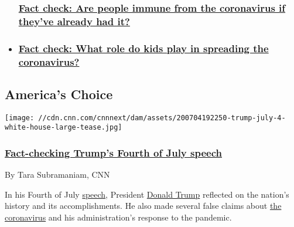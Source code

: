 \begin{itemize}
{  \subsubsection{\texorpdfstring{\href{/2020/07/20/politics/coronavirus-immunity-fact-check/index.html}{Fact
  check: Are people immune from the coronavirus if they've already had
  it?}}{Fact check: Are people immune from the coronavirus if they've already had it?}}\label{fact-check-are-people-immune-from-the-coronavirus-if-theyve-already-had-it}}
\item
  \hypertarget{fact-check-what-role-do-kids-play-in-spreading-the-coronavirus-}{%
  \subsubsection{\texorpdfstring{\href{/2020/07/10/politics/do-kids-spread-coronavirus-fact-check/index.html}{Fact
  check: What role do kids play in spreading the coronavirus?
  }}{Fact check: What role do kids play in spreading the coronavirus? }}\label{fact-check-what-role-do-kids-play-in-spreading-the-coronavirus-}}
\end{itemize}

\hypertarget{americas-choice-}{%
\subsection{America's Choice~}\label{americas-choice-}}

\href{/2020/07/05/politics/fact-checking-trumps-fourth-of-july-speech/index.html}{}

\texttt{[image: //cdn.cnn.com/cnnnext/dam/assets/200704192250-trump-july-4-white-house-large-tease.jpg]}

\hypertarget{fact-checking-trumps-fourth-of-july-speech}{%
\subsubsection{\texorpdfstring{\href{/2020/07/05/politics/fact-checking-trumps-fourth-of-july-speech/index.html}{Fact-checking
Trump's Fourth of July
speech}}{Fact-checking Trump's Fourth of July speech}}\label{fact-checking-trumps-fourth-of-july-speech}}

By Tara Subramaniam, CNN

In his Fourth of July
\href{https://www.cnn.com/2020/07/05/politics/donald-trump-july-4-coronavirus/index.html}{speech},
President
\href{https://www.cnn.com/election/2020/candidate/trump}{Donald Trump}
reflected on the nation's history and its accomplishments. He also made
several false claims about
\href{https://www.cnn.com/interactive/2020/health/coronavirus-us-maps-and-cases/}{the
coronavirus} and his administration's response to the pandemic.

